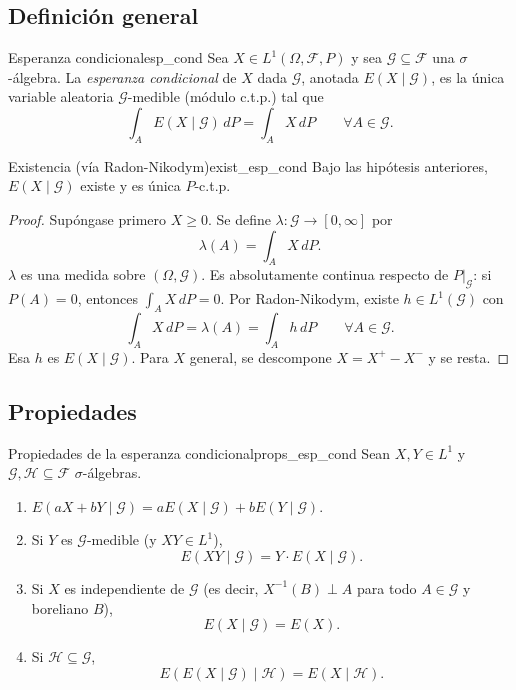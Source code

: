 \documentclass[11pt, a4paper]{article}
\begin{document}
\subsection{Definición general}

\begin{definicion}{Esperanza condicional}{esp_cond}
Sea $X \in L^1(\Omega, \mathcal{F}, P)$ y sea $\mathcal{G} \subseteq \mathcal{F}$ una
$\sigma$-álgebra. La \emph{esperanza condicional} de $X$ dada $\mathcal{G}$, anotada
$E(X \mid \mathcal{G})$, es la única variable aleatoria $\mathcal{G}$-medible (módulo c.t.p.)
tal que
$$ \int_A E(X \mid \mathcal{G}) \, dP = \int_A X \, dP \qquad \forall A \in \mathcal{G}. $$
\end{definicion}

\begin{teorema}{Existencia (vía Radon-Nikodym)}{exist_esp_cond}
Bajo las hipótesis anteriores, $E(X \mid \mathcal{G})$ existe y es única $P$-c.t.p.
\end{teorema}

\begin{proof}
Supóngase primero $X \ge 0$. Se define $\lambda: \mathcal{G} \to [0, \infty]$ por
$$ \lambda(A) = \int_A X \, dP. $$
$\lambda$ es una medida sobre $(\Omega, \mathcal{G})$. Es absolutamente continua respecto de
$P|_{\mathcal{G}}$: si $P(A) = 0$, entonces $\int_A X \, dP = 0$. Por Radon-Nikodym, existe
$h \in L^1(\mathcal{G})$ con
$$ \int_A X \, dP = \lambda(A) = \int_A h \, dP \qquad \forall A \in \mathcal{G}. $$
Esa $h$ es $E(X \mid \mathcal{G})$. Para $X$ general, se descompone $X = X^+ - X^-$ y se resta.
\end{proof}

\subsection{Propiedades}

\begin{proposicion}{Propiedades de la esperanza condicional}{props_esp_cond}
Sean $X, Y \in L^1$ y $\mathcal{G}, \mathcal{H} \subseteq \mathcal{F}$ $\sigma$-álgebras.
\begin{enumerate}
    \item $E(aX + bY \mid \mathcal{G}) = a E(X \mid \mathcal{G}) + b E(Y \mid \mathcal{G})$.
    \item Si $Y$ es $\mathcal{G}$-medible (y $XY \in L^1$),
    $$ E(XY \mid \mathcal{G}) = Y \cdot E(X \mid \mathcal{G}). $$
    \item Si $X$ es independiente de $\mathcal{G}$ (es decir, $X^{-1}(B) \perp A$ para todo $A \in
    \mathcal{G}$ y boreliano $B$),
    $$ E(X \mid \mathcal{G}) = E(X). $$
    \item Si $\mathcal{H} \subseteq \mathcal{G}$,
    $$ E(E(X \mid \mathcal{G}) \mid \mathcal{H}) = E(X \mid \mathcal{H}). $$
\end{enumerate}
\end{proposicion}
\end{document}
